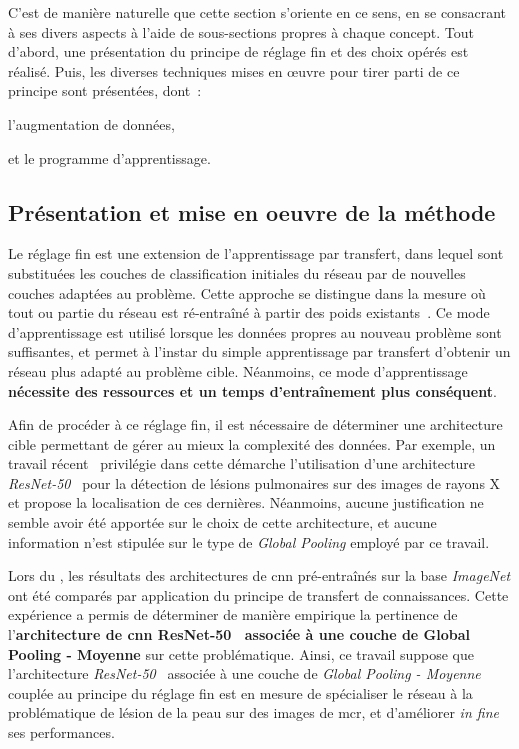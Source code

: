 C'est de manière naturelle que cette section s'oriente en ce sens, en se consacrant à ses divers aspects à l'aide de sous-sections propres à chaque concept. Tout d'abord, une présentation du principe de réglage fin et des choix opérés est réalisé. Puis, les diverses techniques mises en œuvre pour tirer parti de ce principe sont présentées, dont~:
\begin{inlinerate}
    \item l'augmentation de données,
    \item et le programme d'apprentissage.
\end{inlinerate}\par

\subsection{Présentation et mise en oeuvre de la méthode}
Le réglage fin est une extension de l'apprentissage par transfert, dans lequel sont substituées les couches de classification initiales du réseau par de nouvelles couches adaptées au problème. Cette approche se distingue dans la mesure où tout ou partie du réseau est ré-entraîné à partir des poids existants~\cite{Tajbakhsh2016}. Ce mode d'apprentissage est utilisé lorsque les données propres au nouveau problème sont suffisantes, et permet à l'instar du simple apprentissage par transfert d'obtenir un réseau plus adapté au problème cible. Néanmoins, ce mode d'apprentissage \textbf{nécessite des ressources et un temps d'entraînement plus conséquent}.\par

Afin de procéder à ce réglage fin, il est nécessaire de déterminer une architecture cible permettant de gérer au mieux la complexité des données. Par exemple, un travail récent~\cite{Park2019} privilégie dans cette démarche l'utilisation d'une architecture \textit{ResNet-50}~\cite{He2016} pour la détection de lésions pulmonaires sur des images de rayons X et propose la localisation de ces dernières. Néanmoins, aucune justification ne semble avoir été apportée sur le choix de cette architecture, et aucune information n'est stipulée sur le type de \textit{Global Pooling} employé par ce travail.\par

Lors du , les résultats des architectures de \gls{cnn} pré-entraînés sur la base \textit{ImageNet} ont été comparés par application du principe de transfert de connaissances. Cette expérience a permis de déterminer de manière empirique la pertinence de l'\textbf{architecture de \gls{cnn} ResNet-50~\cite{He2016} associée à une couche de Global Pooling - Moyenne} sur cette problématique. Ainsi, ce travail suppose que l'architecture \textit{ResNet-50}~\cite{He2016} associée à une couche de \textit{Global Pooling - Moyenne} couplée au principe du réglage fin est en mesure de spécialiser le réseau à la problématique de lésion de la peau sur des images de \gls{mcr}, et d'améliorer \textit{in fine} ses performances.\par

